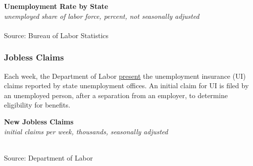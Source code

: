 \documentclass{report}
\newcommand{\tbllink}[1]{\href{https://raw.githubusercontent.com/bdecon/US-chartbook/master/chartbook/data/#1}{\faTable}}
\newcommand{\shticks}{
		date coordinates in=x, axis line style={draw=none},
		xmax={2024-01-31},
		}
\newcommand{\bbar}[2]{extra #1 ticks = {{#2}}, extra #1 tick labels = ,
		extra #1 tick style = {grid=major, grid style={thick, black!25}},}
\newcommand{\stdline}[4]{\addplot[very thick, no markers, color=#1] 
		table [x=#2, y=#3, col sep=comma] {#4};	}
\begin{document}
{\begin{minipage}{1.0\textwidth}
\normalsize \textbf{Unemployment Rate by State}\\
\footnotesize{\textit{unemployed share of labor force, percent, not seasonally adjusted}}\\
\vspace{-2mm}
\hspace{-10mm}  \\
\footnotesize{Source: Bureau of Labor Statistics} \hspace{72mm} \tbllink{state_unrate.csv}
\end{minipage}
\newpage
\begin{minipage}{1.0\textwidth}   
\subsubsection*{Jobless Claims}
\small Each week, the Department of Labor \href{https://www.dol.gov/ui/data.pdf}{present} the unemployment insurance (UI) claims reported by state unemployment offices. An initial claim for UI is filed by an unemployed person, after a separation from an employer, to determine eligibility for benefits.
\end{minipage}
\vspace{1mm}

\begin{minipage}{0.41\textwidth}
\normalsize \textbf{New Jobless Claims}\\
\footnotesize{\textit{initial claims per week, thousands, seasonally adjusted}}
\vspace*{-2mm}

\hspace*{-2mm} \\
\footnotesize{Source: Department of Labor} \hfill \tbllink{icsa.csv} \hspace{1mm}
\end{minipage} \hspace{4mm} \begin{minipage}{0.31\textwidth}
\small 


\end{minipage}}
\end{document}
